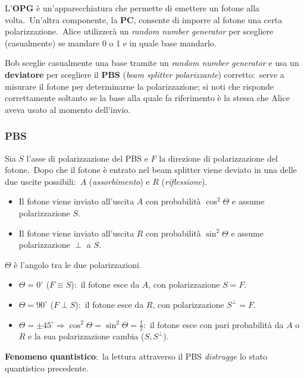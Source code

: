 L'\textbf{OPG} è un'apparecchiatura che permette di emettere un fotone alla volta.\
Un'altra componente, la \textbf{PC}, consente di imporre al fotone una certa polarizzazione.\
Alice utilizzerà un \textit{random number generator} per scegliere (casualmente) se mandare 0 o 1 e in quale base mandarlo.\

Bob sceglie casualmente una base tramite un \textit{random number generator} e usa un \textbf{deviatore} per scegliere il \textbf{PBS} (\textit{beam splitter polarizzante}) corretto:\ serve a misurare il fotone per determinarne la polarizzazione; si noti che risponde correttamente soltanto se la base alla quale fa riferimento è la stessa che Alice aveva usato al momento dell'invio.\

\subsubsection{PBS}

Sia $S$ l'asse di polarizzazione del PBS e $F$ la direzione di polarizzazione del fotone.\
Dopo che il fotone è entrato nel beam splitter viene deviato in una delle due uscite possibili:\ $A$ (\textit{assorbimento}) e $R$ (\textit{riflessione}).\

\begin{itemize}
    \item Il fotone viene inviato all'uscita $A$ con probabilità $\cos^2\Theta$ e assume polarizzazione $S$.
    \item Il fotone viene inviato all'uscita $R$ con probabilità $\sin^2\Theta$ e assume polarizzazione $\perp$ a $S$.
\end{itemize}

\noindent $\Theta$ è l'angolo tra le due polarizzazioni.\

\begin{itemize}
    \item $\Theta = 0^{\circ}$ ($F \equiv S$):\ il fotone esce da $A$, con polarizzazione $S=F$.\
    \item $\Theta = 90^{\circ}$ ($F \perp S$):\ il fotone esce da $R$, con polarizzazione $S^{\perp}=F$.\
    \item $\Theta = \pm 45^{\circ} \Rightarrow \cos^2\Theta = \sin^2\Theta = \frac{1}{2}$:\ il fotone esce con pari probabilità da $A$ o $R$ e la sua polarizzazione cambia ($S, S^{\perp}$).\
\end{itemize}

\noindent \textbf{Fenomeno quantistico}:\ la lettura attraverso il PBS \textit{distrugge} lo stato quantistico precedente.\

